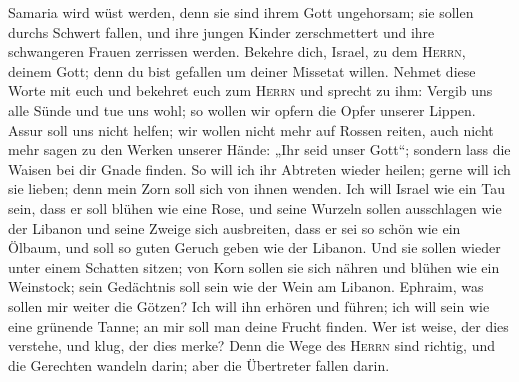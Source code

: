  Samaria wird wüst werden, denn sie sind ihrem Gott
ungehorsam; sie sollen durchs Schwert fallen, und ihre jungen Kinder
zerschmettert und ihre schwangeren Frauen zerrissen werden.
 Bekehre dich, Israel, zu dem \textsc{Herrn}, deinem Gott;
denn du bist gefallen um deiner Missetat willen.  Nehmet
diese Worte mit euch und bekehret euch zum \textsc{Herrn} und sprecht zu
ihm: Vergib uns alle Sünde und tue uns wohl; so wollen wir opfern die
Opfer unserer Lippen.  Assur soll uns nicht helfen; wir
wollen nicht mehr auf Rossen reiten, auch nicht mehr sagen zu den Werken
unserer Hände: „Ihr seid unser Gott``; sondern lass die Waisen bei dir
Gnade finden.  So will ich ihr Abtreten wieder heilen;
gerne will ich sie lieben; denn mein Zorn soll sich von ihnen wenden.
 Ich will Israel wie ein Tau sein, dass er soll blühen wie
eine Rose, und seine Wurzeln sollen ausschlagen wie der Libanon
 und seine Zweige sich ausbreiten, dass er sei so schön
wie ein Ölbaum, und soll so guten Geruch geben wie der Libanon.
 Und sie sollen wieder unter einem Schatten sitzen; von
Korn sollen sie sich nähren und blühen wie ein Weinstock; sein
Gedächtnis soll sein wie der Wein am Libanon.  Ephraim,
was sollen mir weiter die Götzen? Ich will ihn erhören und führen; ich
will sein wie eine grünende Tanne; an mir soll man deine Frucht finden.
 Wer ist weise, der dies verstehe, und klug, der dies
merke? Denn die Wege des \textsc{Herrn} sind richtig, und die Gerechten
wandeln darin; aber die Übertreter fallen darin.

